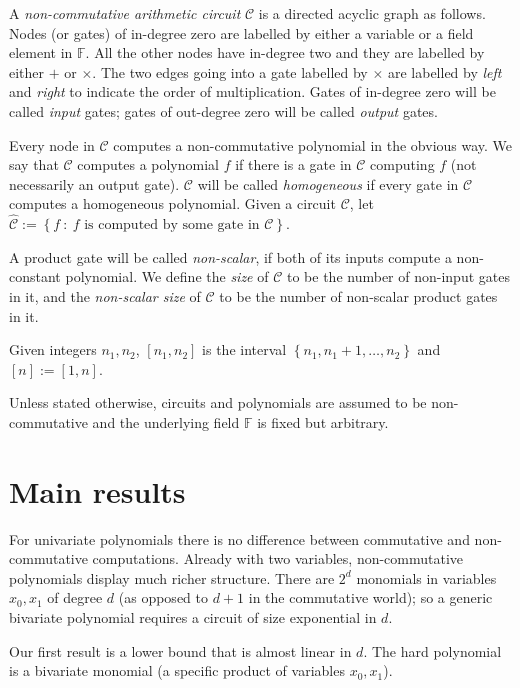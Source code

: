 \documentclass[10pt,a4paper]{article}
\def\Field{\mathbb{F}}
\let\F\Field
\def\set#1{\left\{ #1 \right\}}
\def\inbrace#1{\left\{ #1 \right\}}
\def\setdef#1#2{\inbrace{ #1 \ : \ #2}}      %
\newcommand{\ckt}{\textbf{$\mathcal{C}$}}
\begin{document}
A \emph{non-commutative arithmetic circuit} $\ckt$ is a directed acyclic graph as follows.
Nodes (or gates) of in-degree zero are labelled by either a variable 
or a field element in $\F$.
All the other nodes have in-degree two and they are labelled by 
either $+$ or $\times$.
The two edges going into a gate labelled by $\times$ are labelled by \emph{left} and \emph{right} to indicate the order of multiplication. Gates of in-degree zero will be called \emph{input} gates; gates of out-degree zero will be called \emph{output} gates.  

Every node in $\ckt$ computes a non-commutative polynomial in the obvious way. We say that $\ckt$ computes a polynomial $f$ if there is a gate in $\ckt$ computing $f$ (not necessarily an output gate). 
$\ckt$ will be called \emph{homogeneous} if every gate in $\ckt$ computes a homogeneous polynomial. 
Given a circuit $\ckt$, let $\widehat{\ckt}:= \setdef{f}{f \text{ is computed by some gate in } \ckt}$.

A product gate will be called \emph{non-scalar}, if both of its inputs compute a non-constant polynomial. 
We define the \emph{size} of $\ckt$ to be the number of non-input gates in it, and the \emph{non-scalar size} of $\ckt$ to be the number of non-scalar product gates in it. 

Given integers $n_1,n_2$, $[n_1,n_2]$ is the interval $\set{n_1,n_1+1,\dots, n_2}$ and $[n]:=[1,n]$.  

\bigskip
{} Unless stated otherwise, circuits and polynomials are assumed to be non-commutative and the underlying field $\F$ is fixed but arbitrary.   


\section{Main results}

For univariate polynomials there is no difference between commutative and non-commutative computations.
Already with two variables, non-commutative polynomials display much richer structure.
There are $2^d$ monomials in variables $x_0,x_1$ of degree $d$ (as opposed to $d+1$ in the commutative world); so a generic bivariate polynomial requires a circuit of size exponential in $d$.  

Our first result is a lower bound that is almost linear in $d$. 
The hard polynomial is a bivariate monomial (a specific product of variables $x_0,x_1$).
 
\end{document}
